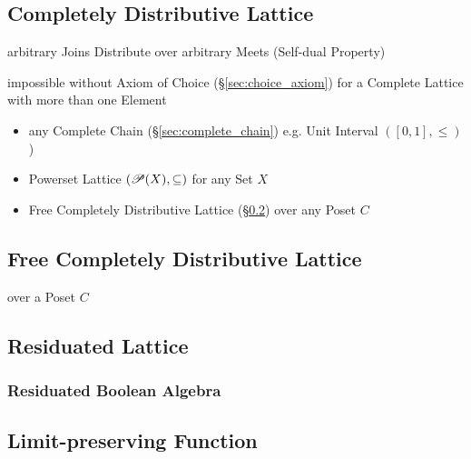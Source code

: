 \subsection{Completely Distributive Lattice}
\label{sec:completely_distributive}

arbitrary Joins Distribute over arbitrary Meets (Self-dual Property)

impossible without Axiom of Choice (\S\ref{sec:choice_axiom}) for a
Complete Lattice with more than one Element

\begin{itemize}
  \item any Complete Chain (\S\ref{sec:complete_chain}) e.g. Unit
    Interval $([0,1], \leq)$)
  \item Powerset Lattice $(\mathscr{P}(X), \subseteq)$ for any Set
    $X$
  \item Free Completely Distributive Lattice
    (\S\ref{sec:free_completely_distributive_lattice}) over any Poset
    $C$
\end{itemize}



\subsection{Free Completely Distributive Lattice}
\label{sec:free_completely_distributive_lattice}

over a Poset $C$



\subsection{Residuated Lattice}\label{sec:residuated_lattice}

\subsubsection{Residuated Boolean Algebra}
\label{sec:residuated_boolean_algebra}



\subsection{Limit-preserving Function}\label{sec:limit_preserving}

